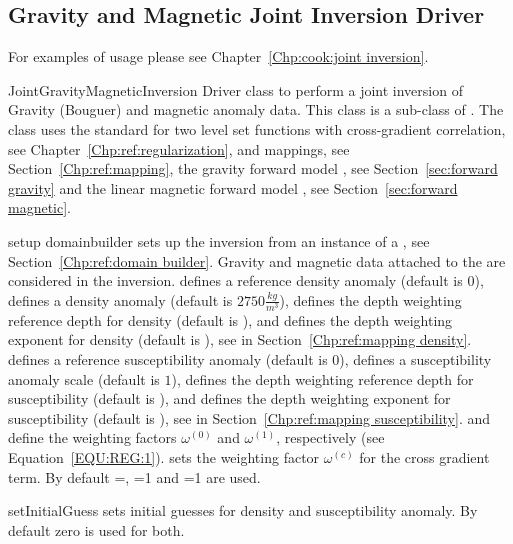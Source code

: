 \subsection{Gravity and Magnetic Joint Inversion Driver}
For examples of usage please see Chapter~\ref{Chp:cook:joint inversion}.

\begin{classdesc}{JointGravityMagneticInversion}{}
Driver class to perform a joint inversion of Gravity (Bouguer) and magnetic anomaly data.
This class is a sub-class of . 
The class uses the standard  for two level set functions
with cross-gradient correlation, see Chapter~\ref{Chp:ref:regularization},
 and  mappings, see Section~\ref{Chp:ref:mapping}, the 
gravity forward model , see Section~\ref{sec:forward gravity}
and the linear
magnetic forward model , see Section~\ref{sec:forward magnetic}.
\end{classdesc}


\begin{methoddesc}[JointGravityMagneticInversion]{setup}{
domainbuilder
}
sets up the inversion from an instance  of a , see Section~\ref{Chp:ref:domain builder}.
Gravity and magnetic data attached to the  are considered in the inversion.
 defines a reference density anomaly (default is $0$),
 defines a density anomaly (default is $2750 \frac{kg}{m^3}$),
 defines the depth weighting reference depth for density (default is \None), and
 defines the depth weighting exponent for density (default is \None),
see  in Section~\ref{Chp:ref:mapping density}.
 defines a reference susceptibility anomaly (default is $0$),
 defines a susceptibility anomaly scale (default is $1$),
 defines the depth weighting reference depth for susceptibility (default is \None), and
 defines the depth weighting exponent for susceptibility (default is \None),
see  in Section~\ref{Chp:ref:mapping susceptibility}.
 and  define the weighting factors
$\omega^{(0)}$ and
$\omega^{(1)}$, respectively (see Equation~\ref{EQU:REG:1}). 
 sets the weighting factor $\omega^{(c)}$ for the cross gradient term. 
By default =\None, =1 and =1 are used.
\end{methoddesc}

\begin{methoddesc}[JointGravityMagneticInversion]{setInitialGuess}{ }
sets initial guesses for density and susceptibility anomaly.
By default zero is used for both.
\end{methoddesc}

